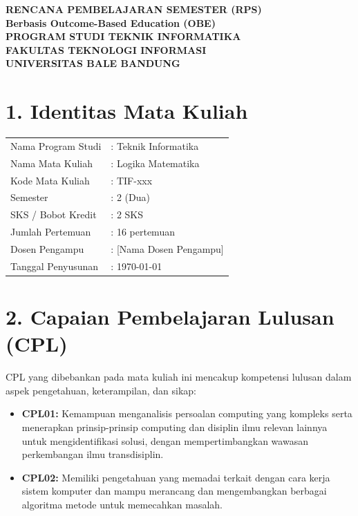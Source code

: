 \documentclass[12pt,a4paper]{article}
\begin{document}
\begin{center}
\textbf{\Large RENCANA PEMBELAJARAN SEMESTER (RPS)}\\
\textbf{Berbasis Outcome-Based Education (OBE)}\\[0.5cm]
\textbf{PROGRAM STUDI TEKNIK INFORMATIKA}\\
\textbf{FAKULTAS TEKNOLOGI INFORMASI}\\
\textbf{UNIVERSITAS BALE BANDUNG}\\
\end{center}

\vspace{1cm}

\section*{1. Identitas Mata Kuliah}
\begin{tabular}{ll}
Nama Program Studi & : Teknik Informatika \\
Nama Mata Kuliah & : Logika Matematika \\
Kode Mata Kuliah & : TIF-xxx \\
Semester & : 2 (Dua) \\
SKS / Bobot Kredit & : 2 SKS \\
Jumlah Pertemuan & : 16 pertemuan \\
Dosen Pengampu & : [Nama Dosen Pengampu] \\
Tanggal Penyusunan & : \today \\
\end{tabular}

\vspace{0.5cm}

\section*{2. Capaian Pembelajaran Lulusan (CPL)}

CPL yang dibebankan pada mata kuliah ini mencakup kompetensi lulusan dalam aspek pengetahuan, keterampilan, dan sikap:

\begin{itemize}[leftmargin=*]
  \item \textbf{CPL01:} Kemampuan menganalisis persoalan computing yang kompleks serta menerapkan prinsip-prinsip computing dan disiplin ilmu relevan lainnya untuk mengidentifikasi solusi, dengan mempertimbangkan wawasan perkembangan ilmu transdisiplin.
  
  \item \textbf{CPL02:} Memiliki pengetahuan yang memadai terkait dengan cara kerja sistem komputer dan mampu merancang dan mengembangkan berbagai algoritma metode untuk memecahkan masalah.
\end{itemize}
\end{document}
